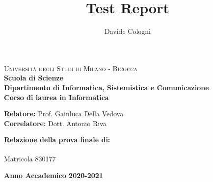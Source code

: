 \documentclass[a4paper,12pt,twoside]{report}
\title{Test Report}
\author{Davide Cologni}
\makeatletter
\let\inserttitle\@title
\let\insertauthor\@author
\makeatother
\begin{document}
    
    \begin{titlepage}
        
        \noindent
        \begin{minipage}[t]{0.19\textwidth}
        \end{minipage}
        \begin{minipage}[t]{0.81\textwidth}
        {
                {\textsc{Università degli Studi di Milano - Bicocca}} \\
                \textbf{Scuola di Scienze} \\
                \textbf{Dipartimento di Informatica, Sistemistica e Comunicazione} \\
                \textbf{Corso di laurea in Informatica} \\
                \par
        }
        \end{minipage}
        
	\vspace{40mm}
        
	\begin{center}
            {\LARGE{
                    \textbf{\inserttitle}
                    \par
            }}
        \end{center}
        
        \vspace{50mm}

        \noindent
        {\large \textbf{Relatore:} Prof. Gainluca Della Vedova } \\

        \noindent
        {\large \textbf{Correlatore:} Dott. Antonio Riva}
        
        \vspace{15mm}

        \begin{flushright}
            {\large \textbf{Relazione della prova finale di:}} \\
            \large{\insertauthor} \\
            \large{Matricola 830177} 
        \end{flushright}
        
        \vspace{40mm}
        \begin{center}
            {\large{\bf Anno Accademico 2020-2021}}
        \end{center}
        
        \restoregeometry
        
    \end{titlepage}
\end{document}
